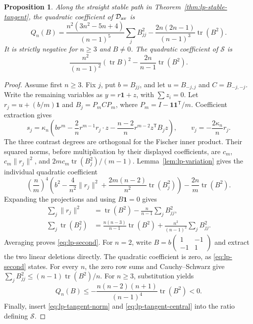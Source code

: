 \documentclass[11pt,a4paper]{article}
\newtheorem{proposition}[theorem]{Proposition}
\theoremstyle{definition}
\theoremstyle{remark}
\newcommand{\T}{\mathsf{T}}
\begin{document}
\begin{proposition}\label{prop:lp-second}
Along the straight stable path in Theorem~\ref{thm:lp-stable-tangent}, the quadratic coefficient of $\mathcal D_{\rm av}$ is
\begin{equation}\label{eq:lp-second}
 Q_n(B)=\frac{n^2(3n^2-5n+4)}{(n-1)^5}\sum_jB_{jj}^2
 -\frac{2n(2n-1)}{(n-1)^3}\operatorname{tr}(B^2).
\end{equation}
It is strictly negative for $n\ge3$ and $B\ne0$.
The quadratic coefficient of $\mathcal S$ is
\[
 \frac{n^2}{(n-1)^2}(\operatorname{tr}B)^2
 -\frac{2n}{n-1}\operatorname{tr}(B^2).
\]
\end{proposition}
\begin{proof}
Assume first $n\ge3$.
Fix $j$, put $b=B_{jj}$, and let $u=B_{-j,j}$ and $C=B_{-j,-j}$.
Write the remaining variables as $y=r\mathbf1+z$, with $\sum z_i=0$.
Let $r_j=u+(b/m)\mathbf1$ and $B_j=P_mCP_m$, where $P_m=I-\mathbf1\mathbf1^\T/m$.
Coefficient extraction gives
\[
 s_j=\kappa_n\left(br^m-\frac2n r^{m-1}r_j\cdot z
 -\frac{n-2}{n}r^{m-2}z^\T B_jz\right),\qquad
 v_j=-\frac{2\kappa_n}{n}r_j.
\]
The three contrast degrees are orthogonal for the Fischer inner product.
Their squared norms, before multiplication by their displayed coefficients, are
$c_m$, $c_m\|r_j\|^2$, and $2mc_m\operatorname{tr}(B_j^2)/(m-1)$.
Lemma~\ref{lem:lp-variation} gives the individual quadratic coefficient
\[
 \left(\frac nm\right)^4
 \left(b^2-\frac4{n^2}\|r_j\|^2
 +\frac{2m(n-2)}{n^2}\operatorname{tr}(B_j^2)\right)
 -\frac{2n}{m}\operatorname{tr}(B^2).
\]
Expanding the projections and using $B\mathbf1=0$ gives
\begin{align*}
 \sum_j\|r_j\|^2
 &=\operatorname{tr}(B^2)-\frac n{n-1}\sum_jB_{jj}^2,\\
 \sum_j\operatorname{tr}(B_j^2)
 &=\frac{n(n-3)}{n-1}\operatorname{tr}(B^2)
 +\frac{n^2}{(n-1)^2}\sum_jB_{jj}^2.
\end{align*}
Averaging proves \eqref{eq:lp-second}.
For $n=2$, write $B=b\left(\begin{smallmatrix}1&-1\\-1&1\end{smallmatrix}\right)$ and extract the two linear deletions directly.
The quadratic coefficient is zero, as \eqref{eq:lp-second} states.
For every $n$, the zero row sums and Cauchy--Schwarz give
$\sum_jB_{jj}^2\le(n-1)\operatorname{tr}(B^2)/n$.
For $n\ge3$, substitution yields
\[
 Q_n(B)\le-\frac{n(n-2)(n+1)}{(n-1)^4}\operatorname{tr}(B^2)<0.
\]
Finally, insert \eqref{eq:lp-tangent-norm} and \eqref{eq:lp-tangent-central} into the ratio defining $\mathcal S$.
\end{proof}
\end{document}
